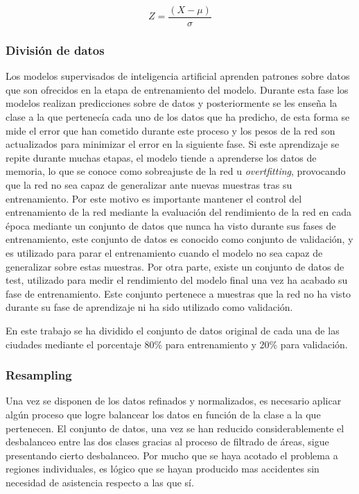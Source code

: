 \documentclass{uathesis-es}
\begin{document}
	\begin{equation}
		Z = \frac{(X - \mu)}{\sigma}
	\end{equation}
	
	
	\subsubsection{División de datos}
	
	
	Los modelos supervisados de inteligencia artificial aprenden patrones sobre datos que son ofrecidos en la etapa de entrenamiento del modelo. Durante esta fase los modelos realizan predicciones sobre de datos y posteriormente se les enseña la clase a la que pertenecía cada uno de los datos que ha predicho, de esta forma se mide el error que han cometido durante este proceso y los pesos de la red son actualizados para minimizar el error en la siguiente fase. Si este aprendizaje se repite durante muchas etapas, el modelo tiende a aprenderse los datos de memoria, lo que se conoce como sobreajuste de la red u \textit{overtfitting}, provocando que la red no sea capaz de generalizar ante nuevas muestras tras su entrenamiento. Por este motivo es importante mantener el control del entrenamiento de la red mediante la evaluación del rendimiento de la red en cada época mediante un conjunto de datos que nunca ha visto durante sus fases de entrenamiento, este conjunto de datos es conocido como conjunto de validación, y es utilizado para parar el entrenamiento cuando el modelo no sea capaz de generalizar sobre estas muestras. Por otra parte, existe un conjunto de datos de test, utilizado para medir el rendimiento del modelo final una vez ha acabado su fase de entrenamiento. Este conjunto pertenece a muestras que la red no ha visto durante su fase de aprendizaje ni ha sido utilizado como validación.
	
	En este trabajo se ha dividido el conjunto de datos original de cada una de las ciudades mediante el porcentaje $80\%$ para entrenamiento y $20\%$ para validación.
	
	\subsubsection{Resampling}
	
	Una vez se disponen de los datos refinados y normalizados, es necesario aplicar algún proceso que logre balancear los datos en función de la clase a la que pertenecen. El conjunto de datos, una vez se han reducido considerablemente el desbalanceo entre las dos clases gracias al proceso de filtrado de áreas, sigue presentando cierto desbalanceo. Por mucho que se haya acotado el problema a regiones individuales, es lógico que se hayan producido mas accidentes sin necesidad de asistencia respecto a las que sí.
	
\end{document}
